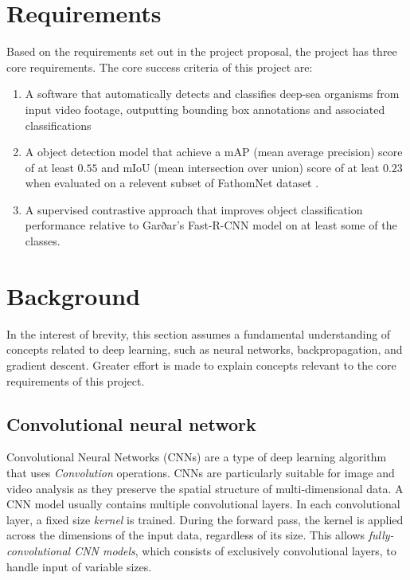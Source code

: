 \documentclass[12pt,a4paper,twoside,openany]{report}
\begin{document}
\section{Requirements}
 Based on the requirements set out in the project proposal, the project has three core requirements. The core success criteria of this project are:
\begin{enumerate}
    \item A software that automatically detects and classifies deep-sea organisms from input video footage, outputting bounding box annotations and associated classifications
    \item A object detection model that achieve a mAP (mean average precision) score of at least $0.55$ and mIoU (mean intersection over union) score of at leat $0.23$ when evaluated on a relevent subset of FathomNet dataset \cite{katija_fathomnet_2022}.
    \item A supervised contrastive approach that improves object classification performance relative to Garðar’s Fast-R-CNN model on at least some of the classes.
\end{enumerate}


\section{Background}
In the interest of brevity, this section assumes a fundamental understanding of concepts related to deep learning, such as neural networks, backpropagation, and gradient descent. Greater effort is made to explain concepts relevant to the core requirements of this project.

\subsection{Convolutional neural network}
Convolutional Neural Networks (CNNs) are a type of deep learning algorithm that uses \textit{Convolution} operations. CNNs are particularly suitable for image and video analysis as they preserve the spatial structure of multi-dimensional data. A CNN model usually contains multiple convolutional layers. In each convolutional layer, a fixed size \textit{kernel} is trained. During the forward pass, the kernel is applied across the dimensions of the input data, regardless of its size. This allows \textit{fully-convolutional CNN models}, which consists of exclusively convolutional layers, to handle input of variable sizes.
\end{document}
